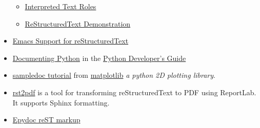 \documentclass[a4paper,11pt,french]{rtdsphinxmanual}
\begin{document}
\begin{itemize}
\begin{itemize}
\item {} 
\href{http://docutils.sourceforge.net/docs/ref/rst/roles.html}{Interpreted Text Roles}

\item {} 
\href{http://docutils.sourceforge.net/docs/user/rst/demo.html}{ReStructuredText Demonstration}

\end{itemize}

\item {} 
\href{http://docutils.sourceforge.net/docs/user/emacs.html}{Emacs Support for reStructuredText}

\item {} 
\href{http://docs.python.org/devguide/documenting.html}{Documenting Python}
in the \href{http://docs.python.org/devguide/}{Python Developer’s Guide}

\item {} 
\href{http://matplotlib.sourceforge.net/sampledoc/}{sampledoc tutorial}
from \href{http://matplotlib.sourceforge.neti/}{matplotlib}
\emph{a python 2D plotting library}.

\item {} 
\href{http://code.google.com/p/rst2pdf/}{rst2pdf} is a
tool for transforming reStructuredText to PDF using ReportLab.
It supports Sphinx formatting.

\item {} 
\href{http://epydoc.sourceforge.net/manual-othermarkup.html}{Epydoc reST markup}

\end{itemize}
\end{document}
